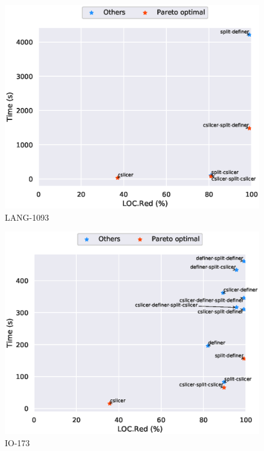 \begin{figure}
\includegraphics[scale=0.7]{plots/pareto/LANG-1093-pareto}
\caption{LANG-1093}
\end{figure}
\begin{figure}
\includegraphics[scale=0.7]{plots/pareto/IO-173-pareto}
\caption{IO-173}
\end{figure}

